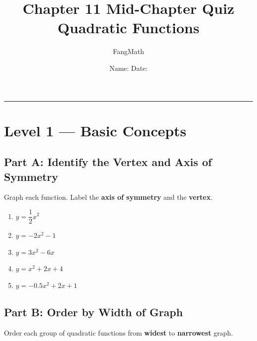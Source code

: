 \documentclass[12pt]{article}
\title{%
  \textbf{\Large Chapter 11 Mid-Chapter Quiz}\\[4pt]
  \large Quadratic Functions\\[2pt] 
}
\author{FangMath}
\date{Name: \underline{\hspace{6cm}} \quad Date: \underline{\hspace{3.5cm}}}
\begin{document}
\maketitle
\vspace{-6pt}
\noindent\rule{\linewidth}{0.6pt}

\section*{\textcolor{green1}{Level 1 — Basic Concepts}}

\subsection*{Part A: Identify the Vertex and Axis of Symmetry}

\noindent Graph each function. Label the \textbf{axis of symmetry} and the \textbf{vertex}.

\begin{enumerate}[leftmargin=*, label=\textbf{\arabic*.}]

  \item $y = \dfrac{1}{2}x^2$
  \vspace{3.5cm}

  \item $y = -2x^2 - 1$
  \vspace{3.5cm}

  \item $y = 3x^2 - 6x$
  \vspace{3.5cm}

  \item $y = x^2 + 2x + 4$
  \vspace{3.5cm}

  \item $y = -0.5x^2 + 2x + 1$
  \vspace{3.5cm}

\end{enumerate}

\subsection*{Part B: Order by Width of Graph}

\noindent Order each group of quadratic functions from \textbf{widest} to \textbf{narrowest} graph.
\end{document}
